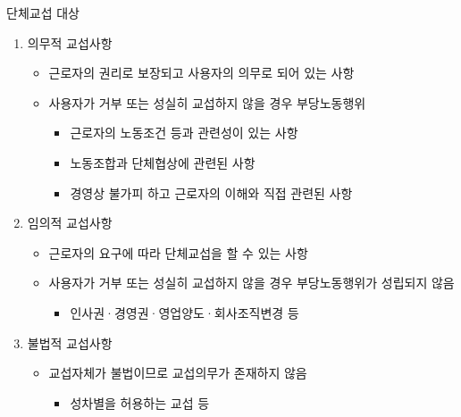\documentclass[aspectratio=169,xcolor=dvipsnames,handout]{beamer}
\begin{document}
\begin{frame}[allowframebreaks]{단체교섭 대상}
    \begin{enumerate}[<+->]
        \item 의무적 교섭사항
        \begin{itemize}[<+->]
            \item 근로자의 권리로 보장되고 사용자의 의무로 되어 있는 사항
            \item 사용자가 거부 또는 성실히 교섭하지 않을 경우 부당노동행위
            \begin{itemize}[<+->]
                \item 근로자의 노동조건 등과 관련성이 있는 사항
                \item 노동조합과 단체협상에 관련된 사항
                \item 경영상 불가피 하고 근로자의 이해와 직접 관련된 사항
            \end{itemize}
        \end{itemize}
    \framebreak\relax
    \item 임의적 교섭사항
        \begin{itemize}[<+->]
            \item 근로자의 요구에 따라 단체교섭을 할 수 있는 사항
            \item 사용자가 거부 또는 성실히 교섭하지 않을 경우 부당노동행위가 성립되지 않음
            \begin{itemize}[<+->]
                \item 인사권·경영권·영업양도·회사조직변경 등
            \end{itemize}
        \end{itemize}
    \item 불법적 교섭사항
        \begin{itemize}[<+->]
            \item 교섭자체가 불법이므로 교섭의무가 존재하지 않음
            \begin{itemize}[<+->]
                \item 성차별을 허용하는 교섭 등
            \end{itemize}
        \end{itemize}
    \end{enumerate}
\end{frame}
\end{document}
